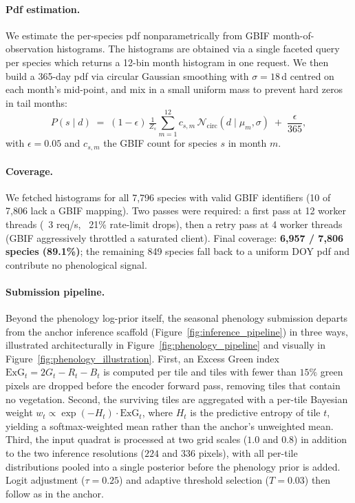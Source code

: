 \paragraph{Pdf estimation.} We estimate the per-species pdf nonparametrically from GBIF month-of-observation histograms. The histograms are obtained via a single faceted query per species
which returns a 12-bin month histogram in one request. We then build a 365-day pdf via circular Gaussian smoothing with $\sigma = 18$\,d centred on each month's mid-point, and mix in a small uniform mass to prevent hard zeros in tail months:
\begin{equation}
  P(s \mid d) \;=\; (1{-}\epsilon)\, \tfrac{1}{Z_s}\!\sum_{m=1}^{12} c_{s,m}\,\mathcal{N}_{\text{circ}}\!\left(d \mid \mu_m, \sigma\right) \;+\; \frac{\epsilon}{365},
\end{equation}
with $\epsilon{=}0.05$ and $c_{s,m}$ the GBIF count for species $s$ in month $m$.

\paragraph{Coverage.} We fetched histograms for all 7{,}796 species with valid GBIF identifiers (10 of 7{,}806 lack a GBIF mapping). Two passes were required: a first pass at 12 worker threads (~3 req/s, ~21\% rate-limit drops), then a retry pass at 4 worker threads (GBIF aggressively throttled a saturated client). Final coverage: \textbf{6{,}957 / 7{,}806 species (89.1\%)}; the remaining 849 species fall back to a uniform DOY pdf and contribute no phenological signal.

\paragraph{Submission pipeline.} Beyond the phenology log-prior itself, the seasonal phenology submission departs from the anchor inference scaffold (Figure~\ref{fig:inference_pipeline}) in three ways, illustrated architecturally in Figure~\ref{fig:phenology_pipeline} and visually in Figure~\ref{fig:phenology_illustration}. First, an Excess Green index $\mathrm{ExG}_t = 2G_t - R_t - B_t$ is computed per tile and tiles with fewer than $15\%$ green pixels are dropped before the encoder forward pass, removing tiles that contain no vegetation. Second, the surviving tiles are aggregated with a per-tile Bayesian weight $w_t \propto \exp(-H_t)\cdot\mathrm{ExG}_t$, where $H_t$ is the predictive entropy of tile $t$, yielding a softmax-weighted mean rather than the anchor's unweighted mean. Third, the input quadrat is processed at two grid scales ($1.0$ and $0.8$) in addition to the two inference resolutions ($224$ and $336$ pixels), with all per-tile distributions pooled into a single posterior before the phenology prior is added. Logit adjustment ($\tau{=}0.25$) and adaptive threshold selection ($T{=}0.03$) then follow as in the anchor.

